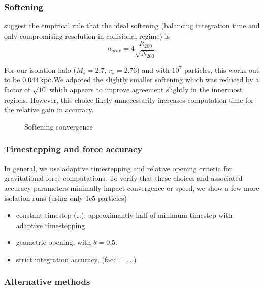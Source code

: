 \subsubsection{Softening}\label{softening}

\citet{power+2003} suggest the empirical rule that the ideal softening
(balancing integration time and only compromising resolution in
collisional regime) is \[
h_{grav} = 4 \frac{R_{200}}{\sqrt{N_{200}}}
\]

For our isolation halo (\(M_s=2.7\), \(r_s=2.76\)) and with \(10^7\)
particles, this works out to be \(0.044\,{\rm kpc}\).We adpoted the
slightly smaller softening which was reduced by a factor of
\(\sqrt{10}\) which appears to improve agreement slightly in the
innermost regions. However, this choice likely unnecessarily increases
computation time for the relative gain in accuracy.

\begin{figure}
\centering
{}
\caption{Softening convergence}\label{fig:softening_convergence}
\end{figure}

\subsubsection{Timestepping and force
accuracy}\label{timestepping-and-force-accuracy}

In general, we use adaptive timestepping and relative opening criteria
for gravitational force computations. To verify that these choices and
associated accuracy parameters minimally impact convergence or speed, we
show a few more isolation runs (using only 1e5 particles)

\begin{itemize}
\tightlist
\item
  constant timestep (\ldots), approximantly half of minimum timestep
  with adaptive timestepping
\item
  geometric opening, with \(\theta = 0.5\).
\item
  strict integration accuracy, (facc = \ldots.)
\end{itemize}

\subsubsection{Alternative methods}\label{alternative-methods}

